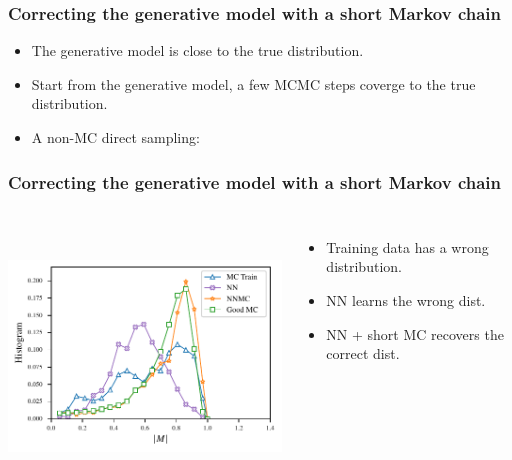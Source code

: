 \documentclass[xcolor=table, 10pt, aspectratio=169, ignorenonframetext]{beamer}
\begin{document}
\begin{frame}
  \frametitle{Correcting the generative model with a short Markov chain}
	\begin{itemize}
		\item The generative model is close to the true distribution.
		\item Start from the generative model, a few MCMC steps coverge to the true distribution.
		\item A non-MC direct sampling:
		\begin{center}
		\end{center}
	\end{itemize}
\end{frame}

\begin{frame}
  \frametitle{Correcting the generative model with a short Markov chain}
	\begin{columns}
		\begin{center}
			\includegraphics[height=7cm]{hist-ising}
		\end{center}
		\begin{itemize}
			\item Training data has a wrong distribution.
			\item NN learns the wrong dist.
			\item NN + short MC recovers the correct dist.
		\end{itemize}
	\end{columns}
\end{frame}
\end{document}
